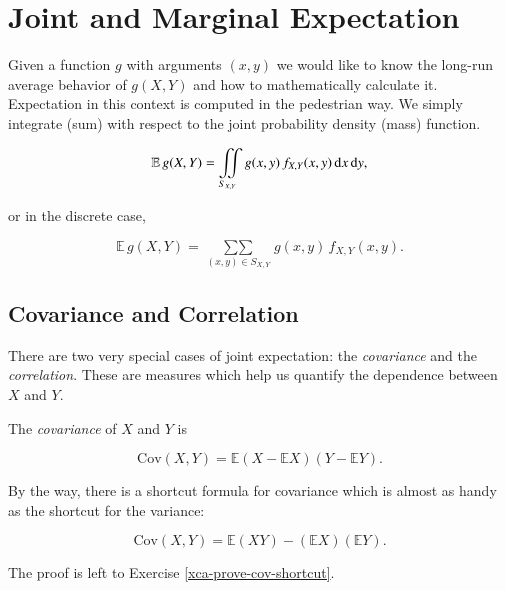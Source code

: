 \documentclass[]{book}
\numberwithin{equation}{chapter}
\numberwithin{figure}{chapter}
\theoremstyle{plain}
\theoremstyle{definition}
\theoremstyle{remark}
\theoremstyle{definition}
\theoremstyle{definition}
\theoremstyle{remark}
\let\BeginKnitrBlock\begin \let\EndKnitrBlock\end
\begin{document}
\section{Joint and Marginal
Expectation}\label{sec-joint-and-marginal-expectation}

Given a function \(g\) with arguments \((x,y)\) we would like to know
the long-run average behavior of \(g(X,Y)\) and how to mathematically
calculate it. Expectation in this context is computed in the pedestrian
way. We simply integrate (sum) with respect to the joint probability
density (mass) function.

\begin{equation}
\mathbb{E}\, g(X,Y)=\iintop_{S_{X,Y}}g(x,y)\, f_{X,Y}(x,y)\,\mathrm{d} x\,\mathrm{d} y,
\end{equation}

or in the discrete case,

\begin{equation}
\mathbb{E}\, g(X,Y)=\mathop{\sum\sum}\limits _{(x,y)\in S_{X,Y}}g(x,y)\, f_{X,Y}(x,y).
\end{equation}

\subsection{Covariance and
Correlation}\label{covariance-and-correlation}

There are two very special cases of joint expectation: the
\emph{covariance} and the \emph{correlation}. These are measures which
help us quantify the dependence between \(X\) and \(Y\).

\bigskip

\BeginKnitrBlock{definition}
\protect\hypertarget{def:unnamed-chunk-305}{}{\label{def:unnamed-chunk-305}}The
\emph{covariance} of \(X\) and \(Y\) is

\begin{equation}
\mbox{Cov}(X,Y)=\mathbb{E}(X-\mathbb{E} X)(Y-\mathbb{E} Y).
\end{equation}
\EndKnitrBlock{definition}

By the way, there is a shortcut formula for covariance which is almost
as handy as the shortcut for the variance:

\begin{equation}
\mbox{Cov}(X,Y)=\mathbb{E}(XY)-(\mathbb{E} X)(\mathbb{E} Y).
\end{equation}

The proof is left to Exercise \ref{xca-prove-cov-shortcut}.
\end{document}
